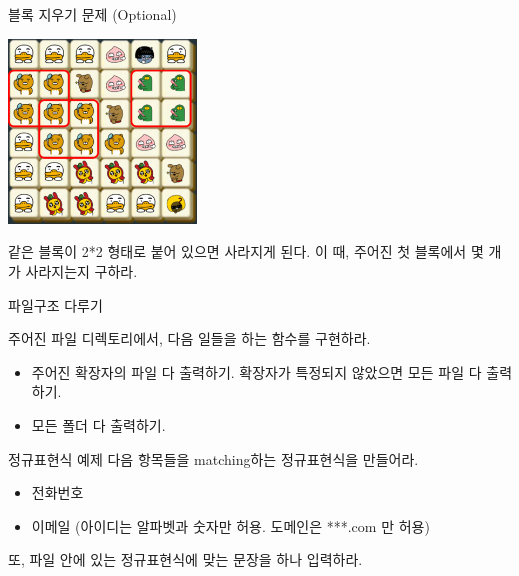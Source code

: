 \documentclass{beamer}
\begin{document}
\begin{frame}[allowframebreaks]{블록 지우기 문제  (Optional)}

\includegraphics[width=5cm,keepaspectratio]{prob6} 

같은 블록이 2*2 형태로 붙어 있으면 사라지게 된다. 이 때, 주어진 첫 블록에서 몇 개가 사라지는지 구하라. 

\end{frame}


\begin{frame}{파일구조 다루기}

주어진 파일 디렉토리에서, 다음 일들을 하는 함수를 구현하라. 

\begin{itemize}
\item 주어진 확장자의 파일 다 출력하기. 확장자가 특정되지 않았으면 모든 파일 다 출력하기. 
\item 모든 폴더 다 출력하기. 
\end{itemize}


\end{frame}

\begin{frame}{정규표현식 예제} 
다음 항목들을 matching하는 정규표현식을 만들어라. 

\begin{itemize} 
\item 전화번호 
\item 이메일 (아이디는 알파벳과 숫자만 허용. 도메인은 ***.com 만 허용)
\end{itemize}

또, 파일 안에 있는 정규표현식에 맞는 문장을 하나 입력하라. 

\end{frame}
\end{document}
